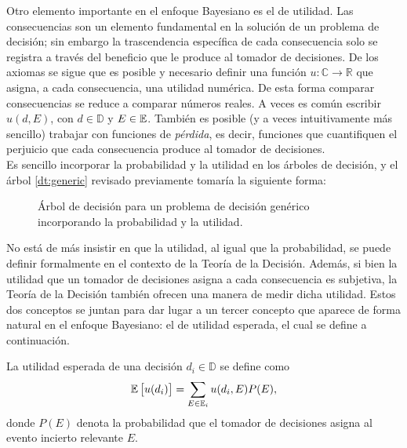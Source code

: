 Otro elemento importante en el enfoque Bayesiano es el de utilidad. Las consecuencias son un elemento fundamental en la solución de un problema de decisión; sin embargo la trascendencia específica de cada consecuencia solo se registra a través del beneficio que le produce al tomador de decisiones. De los axiomas se sigue que es posible y necesario definir una función $u: \mathbb{C} \to \mathbb{R}$ que asigna, a cada consecuencia, una utilidad numérica. De esta forma comparar consecuencias se reduce a comparar números reales. A veces es común escribir $u(d, E)$, con $d \in \mathbb{D}$ y $E \in \mathbb{E}$. También es posible (y a veces intuitivamente más sencillo) trabajar con funciones de \textit{pérdida}, es decir, funciones que cuantifiquen el perjuicio que cada consecuencia produce al tomador de decisiones. \\


Es sencillo incorporar la probabilidad y la utilidad en los árboles de decisión, y el árbol \ref{dt:generic} revisado previamente tomaría la siguiente forma:

\begin{figure}[H]
\centering
{}
\caption{Árbol de decisión para un problema de decisión genérico incorporando la probabilidad y la utilidad.}
\label{dt:generic_2}
\end{figure}



No está de más insistir en que la utilidad, al igual que la probabilidad, se puede definir formalmente en el contexto de la Teoría de la Decisión. Además, si bien la utilidad que un tomador de decisiones asigna a cada consecuencia es subjetiva, la Teoría de la Decisión también ofrecen una manera de medir dicha utilidad. Estos dos conceptos se juntan para dar lugar a un tercer concepto que aparece de forma natural en el enfoque Bayesiano: el de utilidad esperada, el cual se define a continuación.

\begin{definition}
La utilidad esperada de una decisión $d_i \in \mathbb{D}$ se define como
\begin{equation}\label{utilidad_esperada_1}
\mathbb{E} \left[ u(d_i) \right] = \sum_{E \in \mathbb{E}_i} u(d_i, E) P(E),
\end{equation}
donde $P(E)$ denota la probabilidad que el tomador de decisiones asigna al evento incierto relevante $E$.
\end{definition}

